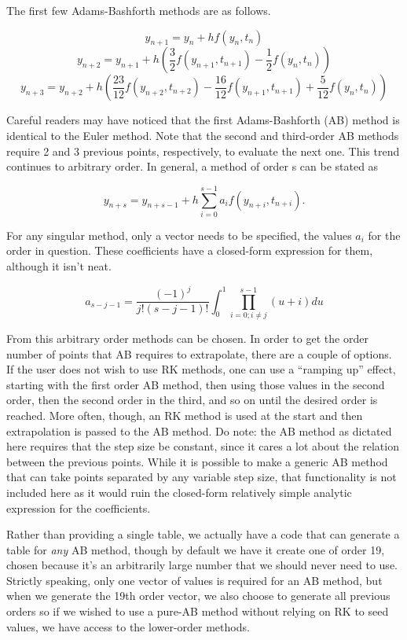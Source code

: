 \documentclass[landscape,letterpaper,10pt,english]{article}
\begin{document}
The first few Adams-Bashforth methods are as follows.

\[y_{n+1} = y_n + hf(y_n,t_n)\]
\[y_{n+2} = y_{n+1} + h\left( \frac32 f(y_{n+1},t_{n+1}) - \frac12 f(y_n,t_n) \right)\]
\[y_{n+3} = y_{n+2} + h\left( \frac{23}{12}f(y_{n+2},t_{n+2}) - \frac{16}{12} f(y_{n+1},t_{n+1}) + \frac{5}{12} f(y_n,t_n) \right)\]

Careful readers may have noticed that the first Adams-Bashforth (AB)
method is identical to the Euler method. Note that the second and
third-order AB methods require 2 and 3 previous points, respectively, to
evaluate the next one. This trend continues to arbitrary order. In
general, a method of order s can be stated as

\[ y_{n+s} = y_{n+s-1} + h \sum_{i=0}^{s-1} a_i f(y_{n+i},t_{n+i}). \]

For any singular method, only a vector needs to be specified, the values
\(a_i\) for the order in question. These coefficients have a closed-form
expression for them, although it isn't neat.

\[a_{s-j-1} = \frac{(-1)^j}{j!(s-j-1)!} \int_0^1 \prod_{i=0;i\neq j}^{s-1} (u+i) du\]

From this arbitrary order methods can be chosen. In order to get the
order number of points that AB requires to extrapolate, there are a
couple of options. If the user does not wish to use RK methods, one can
use a ``ramping up'' effect, starting with the first order AB method,
then using those values in the second order, then the second order in
the third, and so on until the desired order is reached. More often,
though, an RK method is used at the start and then extrapolation is
passed to the AB method. Do note: the AB method as dictated here
requires that the step size be constant, since it cares a lot about the
relation between the previous points. While it is possible to make a
generic AB method that can take points separated by any variable step
size, that functionality is not included here as it would ruin the
closed-form relatively simple analytic expression for the coefficients.

Rather than providing a single table, we actually have a code that can
generate a table for \emph{any} AB method, though by default we have it
create one of order 19, chosen because it's an arbitrarily large number
that we should never need to use. Strictly speaking, only one vector of
values is required for an AB method, but when we generate the 19th order
vector, we also choose to generate all previous orders so if we wished
to use a pure-AB method without relying on RK to seed values, we have
access to the lower-order methods.
\end{document}
